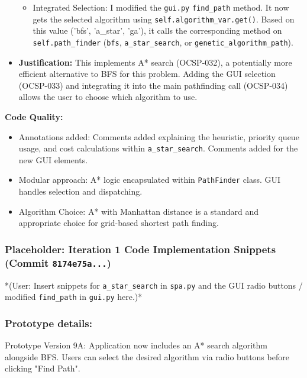 \begin{itemize}
\begin{itemize}
		\item Integrated Selection: I modified the \verb|gui.py| \verb|find_path| method. It now gets the selected algorithm using \verb|self.algorithm_var.get()|. Based on this value ('bfs', 'a_star', 'ga'), it calls the corresponding method on \verb|self.path_finder| (\verb|bfs|, \verb|a_star_search|, or \verb|genetic_algorithm_path|).
	\end{itemize}
	\item \textbf{Justification:} This implements A* search (OCSP-032), a potentially more efficient alternative to BFS for this problem. Adding the GUI selection (OCSP-033) and integrating it into the main pathfinding call (OCSP-034) allows the user to choose which algorithm to use.
\end{itemize}

\textbf{Code Quality:}
\begin{itemize}
	\item Annotations added: Comments added explaining the heuristic, priority queue usage, and cost calculations within \verb|a_star_search|. Comments added for the new GUI elements.
	\item Modular approach: A* logic encapsulated within \verb|PathFinder| class. GUI handles selection and dispatching.
	\item Algorithm Choice: A* with Manhattan distance is a standard and appropriate choice for grid-based shortest path finding.
\end{itemize}

\newpage
\subsubsection*{Placeholder: Iteration 1 Code Implementation Snippets (Commit \verb|8174e75a...|)}
*(User: Insert snippets for \verb|a_star_search| in \verb|spa.py| and the GUI radio buttons / modified \verb|find_path| in \verb|gui.py| here.)*
\newpage

\subsubsection{Prototype details:}
Prototype Version 9A: Application now includes an A* search algorithm alongside BFS. Users can select the desired algorithm via radio buttons before clicking "Find Path".

